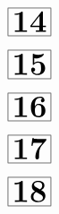 \documentclass[a4paper, 10pt]{article}
\begin{document}
\thispagestyle{empty}
\begin{minipage}[t]{0.17\textwidth}
                \vspace*{-1.59cm}
        \hspace*{2.4cm}
        $\boxed{\textbf{\Huge14}}$
\end{minipage}
\begin{minipage}[t]{0.83\textwidth}
        
\end{minipage}

\thispagestyle{empty}
\begin{minipage}[t]{0.17\textwidth}
                \vspace*{-1.59cm}
        \hspace*{2.4cm}
        $\boxed{\textbf{\Huge15}}$
\end{minipage}
\begin{minipage}[t]{0.83\textwidth}
        
\end{minipage}

\thispagestyle{empty}
\thispagestyle{empty}
\begin{minipage}[t]{0.17\textwidth}
                \vspace*{-1.59cm}
        \hspace*{2.4cm}
        $\boxed{\textbf{\Huge16}}$
\end{minipage}
\begin{minipage}[t]{0.83\textwidth}
        
\end{minipage}

\thispagestyle{empty}
\begin{minipage}[t]{0.17\textwidth}
                \vspace*{-1.59cm}
        \hspace*{2.4cm}
        $\boxed{\textbf{\Huge17}}$
\end{minipage}
\begin{minipage}[t]{0.83\textwidth}
        
\end{minipage}

\thispagestyle{empty}
\begin{minipage}[t]{0.17\textwidth}
                \vspace*{-1.59cm}
        \hspace*{2.4cm}
        $\boxed{\textbf{\Huge18}}$
\end{minipage}
\begin{minipage}[t]{0.83\textwidth}
        
\end{minipage}
\end{document}
